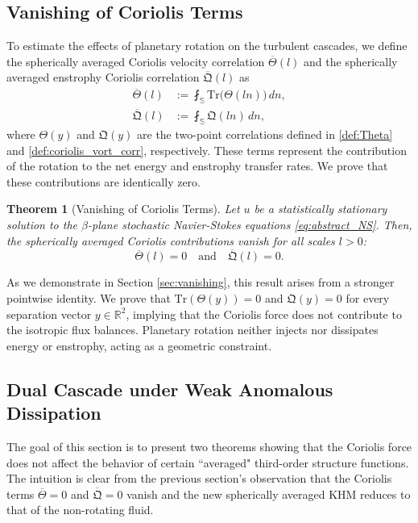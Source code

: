 \documentclass[11pt,a4paper]{article}
\numberwithin{equation}{section}
\newtheorem{theorem}{Theorem}%
\numberwithin{theorem}{section}
\numberwithin{remark}{section}
\numberwithin{definition}{section}
\begin{document}
\subsection{Vanishing of Coriolis Terms}\label{sec:cancellation_main_r}
To estimate the effects of planetary rotation on the turbulent cascades, we define the spherically averaged Coriolis velocity correlation $\overline{\varTheta}(l)$ and the spherically averaged enstrophy Coriolis correlation $\overline{\mathfrak{Q}}(l)$ as
\begin{align}
    \overline{\varTheta}(l) &:= \fint_{\mathbb{S}} \text{Tr}\big(\varTheta(ln)\big) \, dn, \label{eq:Theta_trace_main}\\
    \overline{\mathfrak{Q}}(l) &:= \fint_{\mathbb{S}} \mathfrak{Q}(ln) \, dn, \label{eq:Q_corr_main}
\end{align}
where $\varTheta(y)$ and $\mathfrak{Q}(y)$ are the two-point correlations defined in \eqref{def:Theta} and \eqref{def:coriolis_vort_corr}, respectively. These terms represent the contribution of the rotation to the net energy and enstrophy transfer rates. We prove that these contributions are identically zero.

\begin{theorem}[Vanishing of Coriolis Terms]\label{thm:vanishing_coriolis}
Let $u$ be a statistically stationary solution to the $\beta$-plane stochastic Navier-Stokes equations \eqref{eq:abstract_NS}. Then, the spherically averaged Coriolis contributions vanish for all scales $l > 0$:
\begin{equation}
    \overline{\varTheta}(l) = 0 \quad \text{and} \quad \overline{\mathfrak{Q}}(l) = 0.
\end{equation}
\end{theorem}
As we demonstrate in Section \ref{sec:vanishing}, this result arises from a stronger pointwise identity. We prove that $\text{Tr}(\varTheta(y)) = 0$ and $\mathfrak{Q}(y) = 0$ for every separation vector $y \in \mathbb{R}^2$, implying that the Coriolis force does not contribute to the isotropic flux balances. Planetary rotation neither injects nor dissipates energy or enstrophy, acting as a geometric constraint. 



\subsection{Dual Cascade under Weak Anomalous Dissipation}\label{sec:main_cascade}

The goal of this section is to present two theorems showing that the Coriolis force does not affect the behavior of certain ``averaged" third-order structure functions. 
The intuition is clear from the previous section's observation that the Coriolis terms $\overline{\varTheta} = 0$ and $\overline{\mathfrak{Q}} = 0$ vanish and the new spherically averaged KHM reduces to that of the non-rotating fluid. 
 
\end{document}

